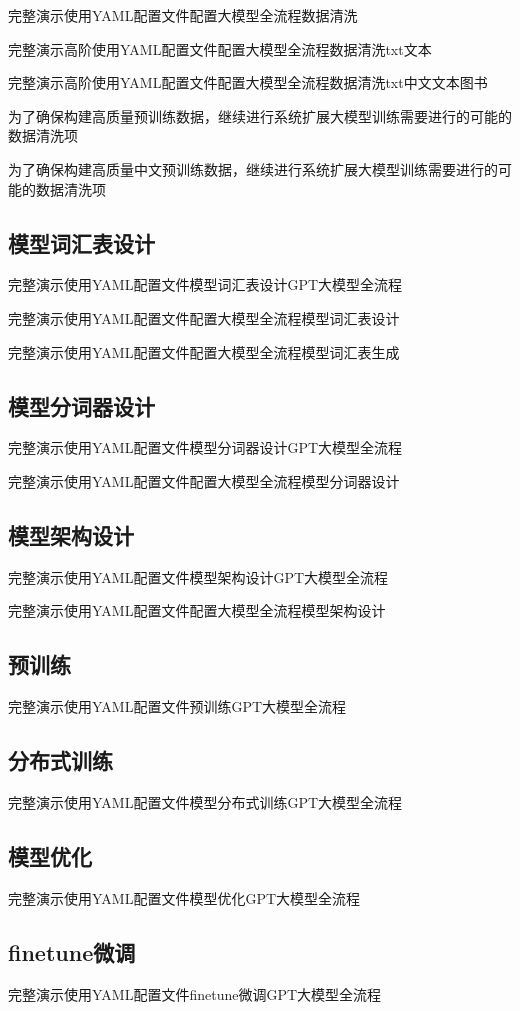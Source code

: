 \documentclass[12pt]{book}
\begin{document}
完整演示使用YAML配置文件配置大模型全流程数据清洗


完整演示高阶使用YAML配置文件配置大模型全流程数据清洗txt文本


完整演示高阶使用YAML配置文件配置大模型全流程数据清洗txt中文文本图书


为了确保构建高质量预训练数据，继续进行系统扩展大模型训练需要进行的可能的数据清洗项

为了确保构建高质量中文预训练数据，继续进行系统扩展大模型训练需要进行的可能的数据清洗项

\subsection{模型词汇表设计}
完整演示使用YAML配置文件模型词汇表设计GPT大模型全流程

完整演示使用YAML配置文件配置大模型全流程模型词汇表设计

完整演示使用YAML配置文件配置大模型全流程模型词汇表生成

\subsection{模型分词器设计}
完整演示使用YAML配置文件模型分词器设计GPT大模型全流程

完整演示使用YAML配置文件配置大模型全流程模型分词器设计

\subsection{模型架构设计}
完整演示使用YAML配置文件模型架构设计GPT大模型全流程

完整演示使用YAML配置文件配置大模型全流程模型架构设计

\subsection{预训练}
完整演示使用YAML配置文件预训练GPT大模型全流程

\subsection{分布式训练}
完整演示使用YAML配置文件模型分布式训练GPT大模型全流程

\subsection{模型优化}
完整演示使用YAML配置文件模型优化GPT大模型全流程

\subsection{finetune微调}
完整演示使用YAML配置文件finetune微调GPT大模型全流程
\end{document}
